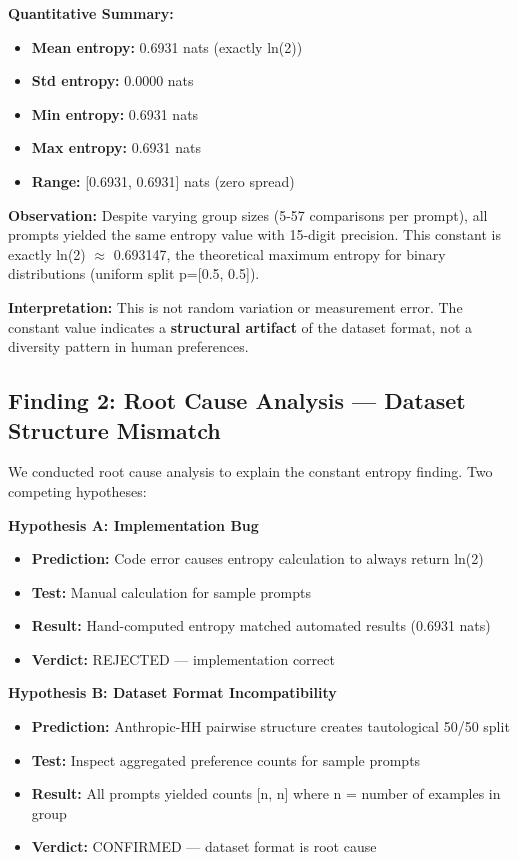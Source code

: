 \textbf{Quantitative Summary:}
\begin{itemize}
\item \textbf{Mean entropy:} 0.6931 nats (exactly ln(2))
\item \textbf{Std entropy:} 0.0000 nats
\item \textbf{Min entropy:} 0.6931 nats
\item \textbf{Max entropy:} 0.6931 nats
\item \textbf{Range:} [0.6931, 0.6931] nats (zero spread)
\end{itemize}

\textbf{Observation:} Despite varying group sizes (5-57 comparisons per prompt), all prompts yielded the same entropy value with 15-digit precision. This constant is exactly ln(2) $\approx$ 0.693147, the theoretical maximum entropy for binary distributions (uniform split p=[0.5, 0.5]).

\textbf{Interpretation:} This is not random variation or measurement error. The constant value indicates a \textbf{structural artifact} of the dataset format, not a diversity pattern in human preferences.

\subsection{Finding 2: Root Cause Analysis — Dataset Structure Mismatch}

We conducted root cause analysis to explain the constant entropy finding. Two competing hypotheses:

\textbf{Hypothesis A: Implementation Bug}
\begin{itemize}
\item \textbf{Prediction:} Code error causes entropy calculation to always return ln(2)
\item \textbf{Test:} Manual calculation for sample prompts
\item \textbf{Result:} Hand-computed entropy matched automated results (0.6931 nats)
\item \textbf{Verdict:} REJECTED — implementation correct
\end{itemize}

\textbf{Hypothesis B: Dataset Format Incompatibility}
\begin{itemize}
\item \textbf{Prediction:} Anthropic-HH pairwise structure creates tautological 50/50 split
\item \textbf{Test:} Inspect aggregated preference counts for sample prompts
\item \textbf{Result:} All prompts yielded counts [n, n] where n = number of examples in group
\item \textbf{Verdict:} CONFIRMED — dataset format is root cause
\end{itemize}

